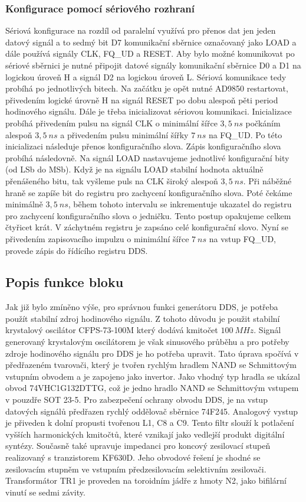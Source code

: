 \subsubsection{Konfigurace pomocí sériového rozhraní}
\indent\indent Sériová konfigurace na rozdíl od paralelní využívá pro přenos dat jen jeden datový signál a to sedmý bit D7 komunikační sběrnice označovaný jako LOAD a dále používá signály CLK, FQ\_UD a RESET. Aby bylo možné komunikovat po sériové sběrnici je nutné připojit datové signály komunikační sběrnice D0 a D1 na logickou úroveň H a signál D2 na logickou úroveň L. Sériová komunikace tedy probíhá po jednotlivých bitech. Na začátku je opět nutné AD9850 restartovat, přivedením logické úrovně H na signál RESET po dobu alespoň pěti period hodinového signálu. Dále je třeba inicializovat sériovou komunikaci. Inicializace probíhá přivedením pulsu na signál CLK o minimální šířce $3,5~ns$ počkáním alespoň $3,5~ns$ a přivedením pulsu minimální šířky $7~ns$ na FQ\_UD. Po této inicializaci následuje přenos konfiguračního slova. Zápis konfiguračního slova probíhá následovně. Na signál LOAD nastavujeme jednotlivé konfigurační bity (od LSb do MSb). Když je na signálu LOAD stabilní hodnota aktuálně přenášeného bitu, tak vyšleme puls na CLK široký alespoň $3,5~ns$. Při náběžné hraně se zapíše bit do registru pro zachycení konfiguračního slova. Poté čekáme minimálně $3,5~ns$, během tohoto intervalu se inkrementuje ukazatel do registru pro zachycení konfiguračního slova o jedničku. Tento postup opakujeme celkem čtyřicet krát. V záchytném registru je zapsáno celé konfigurační slovo. Nyní se přivedením zapisovacího impulzu o minimální šířce $7~ns$ na vstup FQ\_UD, provede zápis do řídícího registru DDS.
  			
\subsection{Popis funkce bloku}
\indent\indent Jak již bylo zmíněno výše, pro správnou funkci generátoru DDS, je potřeba použít stabilní zdroj hodinového signálu. Z tohoto důvodu je použit stabilní krystalový oscilátor CFPS-73-100M který dodává kmitočet $100~MHz$. Signál generovaný krystalovým oscilátorem je však sinusového průběhu a pro potřeby zdroje hodinového signálu pro DDS je ho potřeba upravit. Tato úprava spočívá v předřazeném tvarovači, který je tvořen rychlým hradlem NAND se Schmittovým vstupním obvodem a je zapojeno jako invertor. Jako vhodný typ hradla se ukázal obvod 74VHC1G132DTTG, což je jedno hradlo NAND se Schmittovým vstupem v pouzdře SOT 23-5. 
Pro zabezpečení ochrany obvodu DDS, je na vstup datových signálů předřazen rychlý oddělovač sběrnice 74F245. Analogový vystup je přiveden k dolní propusti tvořenou L1, C8 a C9. Tento filtr slouží k potlačení vyšších harmonických kmitočtů, které vznikají jako vedlejší produkt digitální syntézy. Současně také upravuje impedanci pro koncový zesilovací stupeň realizovaný s tranzistorem KF630D. Jeho obvodové řešení je shodné se zesilovacím stupněm ve vstupním předzesilovacím selektivním zesilovači. Transformátor TR1 je proveden na toroidním jádře z hmoty N2, jako bifilární vinutí se sedmi závity.


